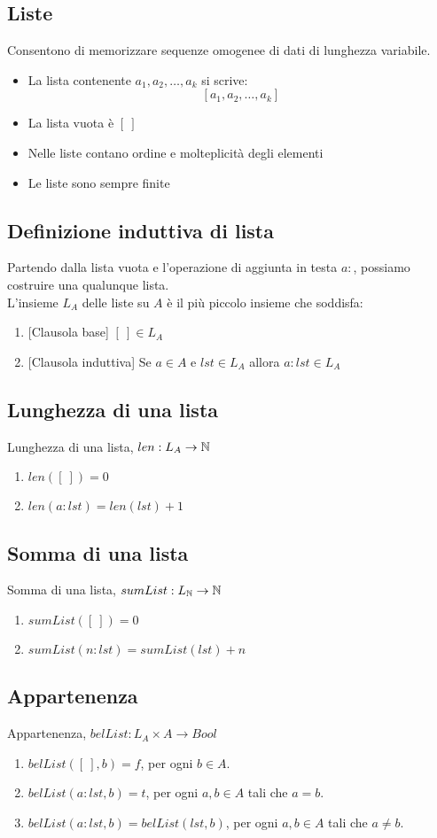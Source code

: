 \documentclass{article}
\begin{document}
\subsection{Liste}
Consentono di memorizzare sequenze omogenee di dati di lunghezza variabile.
\begin{itemize}
    \item La lista contenente \(a_1, a_2, \ldots, a_k\) si scrive: \[[a_1, a_2, \ldots, a_k]\]
    \item La lista vuota è \([\ ]\)
    \item Nelle liste contano ordine e molteplicità degli elementi
    \item Le liste sono sempre finite
\end{itemize}
\subsection*{Definizione induttiva di lista}
Partendo dalla lista vuota e l'operazione di aggiunta in testa \(a:\), possiamo costruire una qualunque lista. \\
L'insieme \(L_A\) delle liste su \(A\) è il più piccolo insieme che soddisfa:
\begin{enumerate}
    \item {[Clausola base]} \([\ ] \in L_A\)
    \item {[Clausola induttiva]} Se \(a \in A\) e \(lst \in L_A\) allora \(a: lst \in L_A\)
\end{enumerate}
\subsection*{Lunghezza di una lista}
Lunghezza di una lista, \(len: L_A \rightarrow \mathbb{N}\)
\begin{enumerate}
    \item \(len([\ ]) = 0\)
    \item \(len(a: lst) = len(lst) + 1\)
\end{enumerate}
\subsection*{Somma di una lista}
Somma di una lista, \(sumList: L_{\mathbb{N}} \rightarrow \mathbb{N}\)
\begin{enumerate}
    \item \(sumList([\ ]) = 0\)
    \item \(sumList(n: lst) = sumList(lst) + n\)
\end{enumerate}
\subsection*{Appartenenza}
Appartenenza, \(belList: L_A \times A \rightarrow Bool\)
\begin{enumerate}
    \item \(belList([\ ], b) = f\), per ogni \(b \in A\).
    \item \(belList(a: lst, b) = t\), per ogni \(a,b \in A\) tali che \(a = b\).
    \item \(belList(a: lst, b) = belList(lst, b)\), per ogni \(a,b \in A\) tali che \(a \neq b\).
\end{enumerate}
\end{document}
